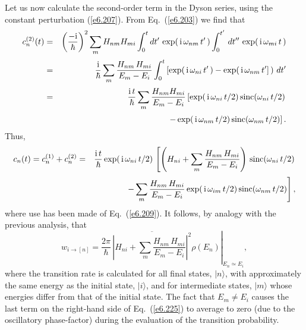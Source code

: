 Let us now calculate  the second-order term in the Dyson series, using the
constant perturbation (\ref{e6.207}). From Eq.~(\ref{e6.203}) we find that
\begin{eqnarray}
c_n^{(2)}(t) &= &\left(\frac{-{\rm i}}{\hbar}\right)^2 \sum_m H_{nm} H_{mi}
\int_0^t dt'\, \exp(\,{\rm i}\,\omega_{nm}\,t'\,) \int_0^{t'} \,
dt'' \,\exp(\,{\rm i} \,\omega_{mi}\,t\,)\nonumber\\[0.5ex]
&=&\frac{\rm i}{\hbar} \sum_m \frac{H_{nm} \,H_{mi}}{E_m - E_i}
\int_0^t\left[\exp(\,{\rm i}\,\omega_{ni}\,t'\,)
 - \exp(\,{\rm i}\,\omega_{nm}\,t']\,\right)\,dt'\nonumber\\[0.5ex]
&=& \frac{{\rm i}\,t}{\hbar} \sum_m \frac{H_{nm} H_{mi}}{E_m - E_i}
\left[ \exp(\,{\rm i}\,\omega_{ni}\, t/2) \,{\rm sinc}(\omega_{ni}\,t/2)\right.
\nonumber\\[0.5ex]
&&\mbox{\hspace{2cm}}\left.- \exp(\,{\rm i}\,\omega_{nm} \,t/2) \,{\rm sinc}(\omega_{nm}\,t/2)\right].
\end{eqnarray}
Thus,
\begin{eqnarray}
c_n(t) = c_n^{(1)}+ c_n^{(2)} &= & \frac{{\rm i}\,t}{\hbar}
\exp(\,{\rm i}\,\omega_{ni}\,t/2)\,
\left[ \left(H_{ni} + \sum_m \frac{H_{nm}\,H_{mi}}{E_m - E_i}\right)\, {\rm sinc} (\omega_{ni}\,t/2)\right.\nonumber
\\[0.5ex]&&\left.
 - \sum_m\frac{H_{nm}\,H_{mi}}{E_m - E_i}
\exp(\,{\rm i}\,\omega_{im}\,t/2)\,{\rm sinc}(\omega_{nm}\,t/2)\right],\label{e6.225}
\end{eqnarray}
where use has been made of Eq.~(\ref{e6.209}). It follows, by analogy with the
previous analysis, that
\begin{equation}\label{e6.226}
w_{i\rightarrow [n]} =\left. \frac{2\pi}{\hbar}\, \overline{ \left|
H_{ni} + \sum_m \frac{H_{nm}\,H_{mi}}{E_m - E_i}\right|^2} \rho(E_n)
\right|_{E_n  \simeq E_i},
\end{equation}
where the transition rate is calculated for all final states, $|n\rangle$, with
approximately the same energy as the initial state, $|i\rangle$, and for
intermediate states, $|m\rangle$ whose energies differ from that of
the initial state. The fact that $E_m\neq E_i$ causes the last term on the
right-hand side of Eq.~(\ref{e6.225}) to average to zero (due to the oscillatory
phase-factor) during the evaluation of the transition probability. 

